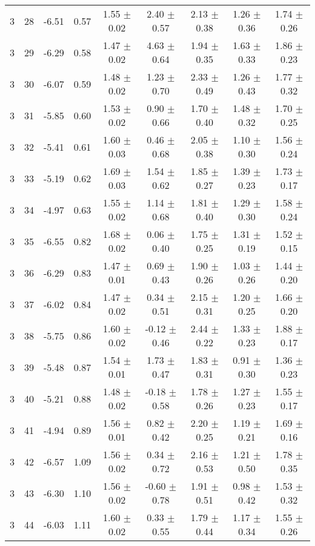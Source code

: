 \begin{landscape}
\begin{longtable}{ccccccccc}
   3 & 28 & -6.51 & 0.57 & 1.55 $\pm$ 0.02 & 2.40 $\pm$ 0.57 & 2.13 $\pm$ 0.38 & 1.26 $\pm$ 0.36 & 1.74 $\pm$ 0.26\\
   3 & 29 & -6.29 & 0.58 & 1.47 $\pm$ 0.02 & 4.63 $\pm$ 0.64 & 1.94 $\pm$ 0.35 & 1.63 $\pm$ 0.33 & 1.86 $\pm$ 0.23\\
   3 & 30 & -6.07 & 0.59 & 1.48 $\pm$ 0.02 & 1.23 $\pm$ 0.70 & 2.33 $\pm$ 0.49 & 1.26 $\pm$ 0.43 & 1.77 $\pm$ 0.32\\
   3 & 31 & -5.85 & 0.60 & 1.53 $\pm$ 0.02 & 0.90 $\pm$ 0.66 & 1.70 $\pm$ 0.40 & 1.48 $\pm$ 0.32 & 1.70 $\pm$ 0.25\\
   3 & 32 & -5.41 & 0.61 & 1.60 $\pm$ 0.03 & 0.46 $\pm$ 0.68 & 2.05 $\pm$ 0.38 & 1.10 $\pm$ 0.30 & 1.56 $\pm$ 0.24\\
   3 & 33 & -5.19 & 0.62 & 1.69 $\pm$ 0.03 & 1.54 $\pm$ 0.62 & 1.85 $\pm$ 0.27 & 1.39 $\pm$ 0.23 & 1.73 $\pm$ 0.17\\
   3 & 34 & -4.97 & 0.63 & 1.55 $\pm$ 0.02 & 1.14 $\pm$ 0.68 & 1.81 $\pm$ 0.40 & 1.29 $\pm$ 0.30 & 1.58 $\pm$ 0.24\\
   3 & 35 & -6.55 & 0.82 & 1.68 $\pm$ 0.02 & 0.06 $\pm$ 0.40 & 1.75 $\pm$ 0.25 & 1.31 $\pm$ 0.19 & 1.52 $\pm$ 0.15\\
   3 & 36 & -6.29 & 0.83 & 1.47 $\pm$ 0.01 & 0.69 $\pm$ 0.43 & 1.90 $\pm$ 0.26 & 1.03 $\pm$ 0.26 & 1.44 $\pm$ 0.20\\
   3 & 37 & -6.02 & 0.84 & 1.47 $\pm$ 0.02 & 0.34 $\pm$ 0.51 & 2.15 $\pm$ 0.31 & 1.20 $\pm$ 0.25 & 1.66 $\pm$ 0.20\\
   3 & 38 & -5.75 & 0.86 & 1.60 $\pm$ 0.02 & -0.12 $\pm$ 0.46 & 2.44 $\pm$ 0.22 & 1.33 $\pm$ 0.23 & 1.88 $\pm$ 0.17\\
   3 & 39 & -5.48 & 0.87 & 1.54 $\pm$ 0.01 & 1.73 $\pm$ 0.47 & 1.83 $\pm$ 0.31 & 0.91 $\pm$ 0.30 & 1.36 $\pm$ 0.23\\
   3 & 40 & -5.21 & 0.88 & 1.48 $\pm$ 0.02 & -0.18 $\pm$ 0.58 & 1.78 $\pm$ 0.26 & 1.27 $\pm$ 0.23 & 1.55 $\pm$ 0.17\\
   3 & 41 & -4.94 & 0.89 & 1.56 $\pm$ 0.01 & 0.82 $\pm$ 0.42 & 2.20 $\pm$ 0.25 & 1.19 $\pm$ 0.21 & 1.69 $\pm$ 0.16\\
   3 & 42 & -6.57 & 1.09 & 1.56 $\pm$ 0.02 & 0.34 $\pm$ 0.72 & 2.16 $\pm$ 0.53 & 1.21 $\pm$ 0.50 & 1.78 $\pm$ 0.35\\
   3 & 43 & -6.30 & 1.10 & 1.56 $\pm$ 0.02 & -0.60 $\pm$ 0.78 & 1.91 $\pm$ 0.51 & 0.98 $\pm$ 0.42 & 1.53 $\pm$ 0.32\\
   3 & 44 & -6.03 & 1.11 & 1.60 $\pm$ 0.02 & 0.33 $\pm$ 0.55 & 1.79 $\pm$ 0.44 & 1.17 $\pm$ 0.34 & 1.55 $\pm$ 0.26\\

\end{longtable}
\end{landscape}
